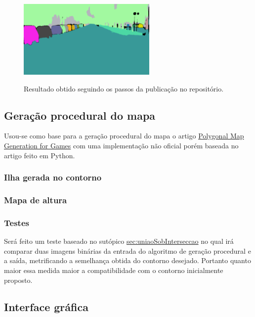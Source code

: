 \begin{figure}[!ht]
	\centering
    \caption{Resultado obtido seguindo os passos da publicação no repositório.}
	\includegraphics[width=0.6\textwidth]{figures/resultado_obtido.png}
	\label{fig:resultado_obtido}
\end{figure}

\subsection{Geração procedural do mapa}

Usou-se como base para a geração procedural do mapa o artigo \hyperref[sec:geracaoProcedural]{Polygonal Map Generation for Games} com uma implementação não oficial porém baseada no artigo feito em Python.

\subsubsection{Ilha gerada no contorno}

\subsubsection{Mapa de altura}

\subsubsection{Testes}

Será feito um teste baseado no sutópico \hyperref[união sob intersecção]{sec:uniaoSobInterseccao} no qual irá comparar duas imagens binárias da entrada do algoritmo de geração procedural e a saída, metrificando a semelhança obtida do contorno desejado. Portanto quanto maior essa medida maior a compatibilidade com o contorno inicialmente proposto.

\subsection{Interface gráfica}

